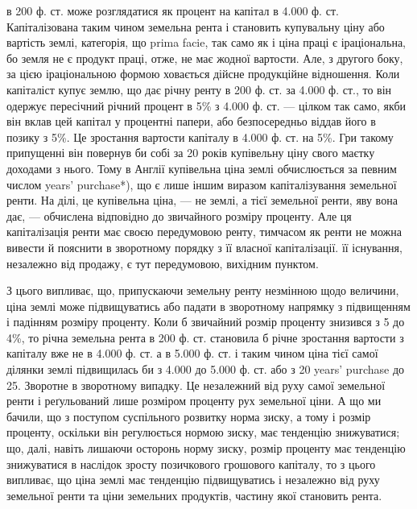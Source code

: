 в 200 ф. ст. може розглядатися як процент на капітал в 4.000 ф. ст. Капіталізована
таким чином земельна рента і становить купувальну ціну або вартість землі,
категорія, що prima facie, так само як і ціна праці є іраціональна, бо земля не є продукт
праці, отже, не має жодної вартости. Але, з другого боку, за цією іраціональною
формою ховається дійсне продукційне відношення. Коли капіталіст купує
землю, що дає річну ренту в 200 ф. ст. за 4.000 ф. ст., то він одержує пересічний річний
процент в 5\% з 4.000 ф. ст. — цілком так само, якби він вклав цей капітал у
процентні папери, або безпосередньо віддав його в позику з 5\%. Це зростання вартости
капіталу в 4.000 ф. ст. на 5\%. Гри такому припущенні він повернув би собі
за 20 років купівельну ціну свого маєтку доходами з нього. Тому в Англії купівельна
ціна землі обчислюється за певним числом years’ purchase*), що є лише іншим
виразом капіталізування земельної ренти. На ділі, це купівельна ціна, — не
землі, а тієї земельної ренти, яву вона дає, — обчислена відповідно до звичайного
розміру проценту. Але ця капіталізація ренти має своєю передумовою
ренту, тимчасом як ренти не можна вивести й пояснити в зворотному порядку
з її власної капіталізації. її існування, незалежно від продажу, є тут
передумовою, вихідним пунктом.

З цього випливає, що, припускаючи земельну ренту незмінною щодо величини,
ціна землі може підвищуватись або падати в зворотному напрямку з
підвищенням і падінням розміру проценту. Коли б звичайний розмір проценту
знизився з 5 до 4\%, то річна земельна рента в 200 ф. ст. становила б річне
зростання вартости з капіталу вже не в 4.000 ф. ст. а в 5.000 ф. ст. і таким чином
ціна тієї самої ділянки землі підвищилась би з 4.000 до 5.000 ф. ст. або з 20 years’
purchase до 25. Зворотне в зворотному випадку. Це незалежний від руху самої
земельної ренти і реґульований лише розміром проценту рух земельної ціни.
А що ми бачили, що з поступом суспільного розвитку норма зиску, а тому і
розмір проценту, оскільки він регулюється нормою зиску, має тенденцію
знижуватися; що, далі, навіть лишаючи осторонь норму зиску, розмір проценту
має тенденцію знижуватися в наслідок зросту позичкового грошового капіталу,
то з цього випливає, що ціна землі має тенденцію підвищуватись і незалежно
від руху земельної ренти та ціни земельних продуктів, частину якої становить
рента.

